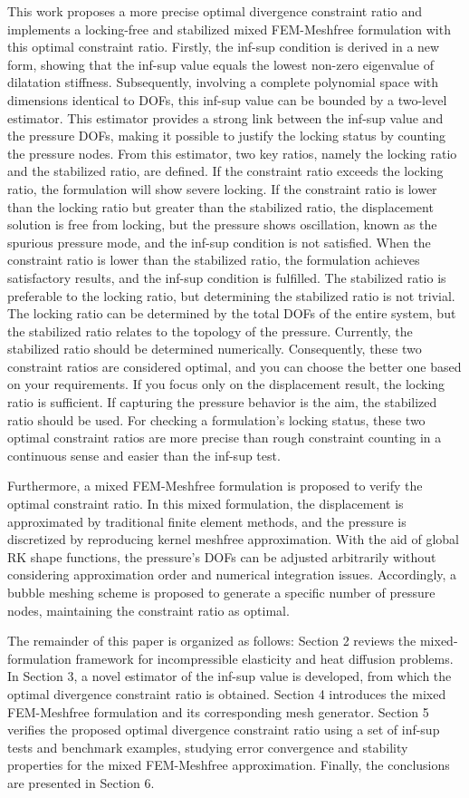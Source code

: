 This work proposes a more precise optimal divergence constraint ratio and implements a locking-free and stabilized mixed FEM-Meshfree formulation with this optimal constraint ratio. Firstly, the inf-sup condition is derived in a new form, showing that the inf-sup value equals the lowest non-zero eigenvalue of dilatation stiffness. Subsequently, involving a complete polynomial space with dimensions identical to DOFs, this inf-sup value can be bounded by a two-level estimator. This estimator provides a strong link between the inf-sup value and the pressure DOFs, making it possible to justify the locking status by counting the pressure nodes. From this estimator, two key ratios, namely the locking ratio and the stabilized ratio, are defined. If the constraint ratio exceeds the locking ratio, the formulation will show severe locking. If the constraint ratio is lower than the locking ratio but greater than the stabilized ratio, the displacement solution is free from locking, but the pressure shows oscillation, known as the spurious pressure mode, and the inf-sup condition is not satisfied. When the constraint ratio is lower than the stabilized ratio, the formulation achieves satisfactory results, and the inf-sup condition is fulfilled. The stabilized ratio is preferable to the locking ratio, but determining the stabilized ratio is not trivial. The locking ratio can be determined by the total DOFs of the entire system, but the stabilized ratio relates to the topology of the pressure. Currently, the stabilized ratio should be determined numerically. Consequently, these two constraint ratios are considered optimal, and you can choose the better one based on your requirements. If you focus only on the displacement result, the locking ratio is sufficient. If capturing the pressure behavior is the aim, the stabilized ratio should be used. For checking a formulation's locking status, these two optimal constraint ratios are more precise than rough constraint counting in a continuous sense and easier than the inf-sup test.

Furthermore, a mixed FEM-Meshfree formulation is proposed to verify the optimal constraint ratio. In this mixed formulation, the displacement is approximated by traditional finite element methods, and the pressure is discretized by reproducing kernel meshfree approximation. With the aid of global RK shape functions, the pressure's DOFs can be adjusted arbitrarily without considering approximation order and numerical integration issues. Accordingly, a bubble meshing scheme is proposed to generate a specific number of pressure nodes, maintaining the constraint ratio as optimal.

The remainder of this paper is organized as follows:
Section 2 reviews the mixed-formulation framework for incompressible elasticity and heat diffusion problems. In Section 3, a novel estimator of the inf-sup value is developed, from which the optimal divergence constraint ratio is obtained. Section 4 introduces the mixed FEM-Meshfree formulation and its corresponding mesh generator. Section 5 verifies the proposed optimal divergence constraint ratio using a set of inf-sup tests and benchmark examples, studying error convergence and stability properties for the mixed FEM-Meshfree approximation. Finally, the conclusions are presented in Section 6.
